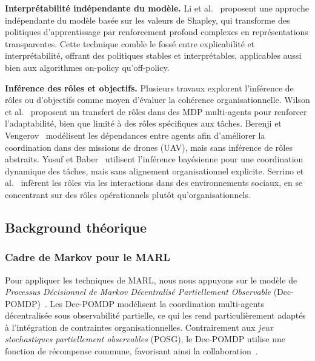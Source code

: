 \textbf{Interprétabilité indépendante du modèle.} Li et al.~\cite{li2025from} proposent une approche indépendante du modèle basée sur les valeurs de Shapley, qui transforme des politiques d'apprentissage par renforcement profond complexes en représentations transparentes. Cette technique comble le fossé entre explicabilité et interprétabilité, offrant des politiques stables et interprétables, applicables aussi bien aux algorithmes on-policy qu'off-policy.

\textbf{Inférence des rôles et objectifs.} Plusieurs travaux explorent l'inférence de rôles ou d'objectifs comme moyen d'évaluer la cohérence organisationnelle. Wilson et al.~\cite{wilson2008learning} proposent un transfert de rôles dans des MDP multi-agents pour renforcer l'adaptabilité, bien que limité à des rôles spécifiques aux tâches. Berenji et Vengerov~\cite{berenji2000learning} modélisent les dépendances entre agents afin d'améliorer la coordination dans des missions de drones (UAV), mais sans inférence de rôles abstraits. Yusuf et Baber~\cite{yusuf2020inferential} utilisent l'inférence bayésienne pour une coordination dynamique des tâches, mais sans alignement organisationnel explicite. Serrino et al.~\cite{serrino2019finding} infèrent les rôles via les interactions dans des environnements sociaux, en se concentrant sur des rôles opérationnels plutôt qu'organisationnels.



\subsection{Background théorique}\label{sec:background}

\subsubsection{Cadre de Markov pour le MARL}

Pour appliquer les techniques de MARL, nous nous appuyons sur le modèle de \textit{Processus Décisionnel de Markov Décentralisé Partiellement Observable} (Dec-POMDP)~\cite{Oliehoek2016}. Les Dec-POMDP modélisent la coordination multi-agents décentralisée sous observabilité partielle, ce qui les rend particulièrement adaptés à l'intégration de contraintes organisationnelles. Contrairement aux \textit{jeux stochastiques partiellement observables} (POSG), le Dec-POMDP utilise une fonction de récompense commune, favorisant ainsi la collaboration~\cite{Beynier2013}.

